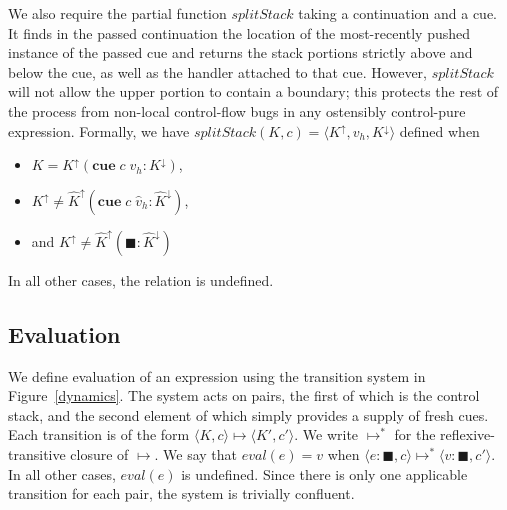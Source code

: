 \documentclass[11pt]{article}
\newcommand{\tuple}[1]{\langle{}{#1}\rangle{}}
\begin{document}
We also require the partial function $splitStack$ taking a continuation and a cue.
It finds in the passed continuation the location of the most-recently pushed instance of the passed cue and returns the stack portions strictly above and below the cue, as well as the handler attached to that cue.
However, $splitStack$ will not allow the upper portion to contain a boundary; this protects the rest of the process from non-local control-flow bugs in any ostensibly control-pure expression.
Formally, we have $splitStack(K, c) = \tuple{K^\uparrow, v_h, K^\downarrow}$ defined when 
\begin{itemize}
\item $K = K^\uparrow(\textbf{cue}\;c\;v_h : K^\downarrow)$,
\item $K^\uparrow \neq \hat{K}^\uparrow(\textbf{cue}\;c\;\hat{v}_h : \hat{K}^\downarrow)$,
\item and $K^\uparrow \neq \hat{K}^\uparrow(\blacksquare : \hat{K}^\downarrow)$
\end{itemize}
In all other cases, the relation is undefined.


\subsection{Evaluation}

We define evaluation of an expression using the transition system in Figure~\ref{dynamics}.
The system acts on pairs, the first of which is the control stack, and the second element of which simply provides a supply of fresh cues.
Each transition is of the form $\tuple{K, c} \longmapsto \tuple{K', c'}$.
We write $\longmapsto^*$ for the reflexive-transitive closure of $\longmapsto$.
We say that $eval(e) = v$ when $\tuple{e:\blacksquare,c} \longmapsto^* \tuple{v:\blacksquare,c'}$.
In all other cases, $eval(e)$ is undefined.
Since there is only one applicable transition for each pair, the system is trivially confluent.
\end{document}

